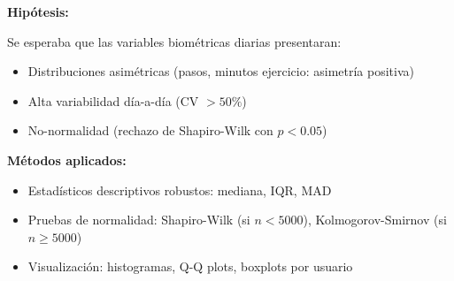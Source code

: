 \documentclass[12pt,letterpaper,twoside]{report}
\begin{document}
\begin{hipotesisbox}
\textbf{Hipótesis:}

Se esperaba que las variables biométricas diarias presentaran:
\begin{itemize}[noitemsep]
    \item Distribuciones asimétricas (pasos, minutos ejercicio: asimetría positiva)
    \item Alta variabilidad día-a-día (CV $> 50\%$)
    \item No-normalidad (rechazo de Shapiro-Wilk con $p<0.05$)
\end{itemize}
\end{hipotesisbox}

\begin{estadisticobox}
\textbf{Métodos aplicados:}

\begin{itemize}[noitemsep]
    \item Estadísticos descriptivos robustos: mediana, IQR, MAD
    \item Pruebas de normalidad: Shapiro-Wilk (si $n<5000$), Kolmogorov-Smirnov (si $n \geq 5000$)
    \item Visualización: histogramas, Q-Q plots, boxplots por usuario
\end{itemize}
\end{estadisticobox}

\begin{table}[H]
\centering
\caption{Estadísticos Descriptivos de Variables Clave (Nivel Diario, $n=8,380$ días)}
\label{tab:descriptive_daily}
\end{table}
\end{document}
